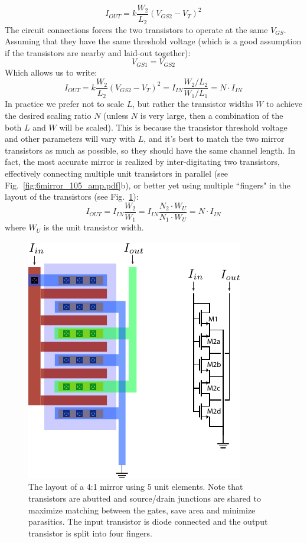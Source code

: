     \begin{equation}
        {I_{OUT}} = k\frac{{{W_2}}}{{{L_2}}}{({V_{GS2}} - {V_T})^2}
    \end{equation}
The circuit connections forces the two transistors to operate at the same $V_{GS}$.  Assuming that they have the same threshold voltage (which is a good assumption if the transistors are nearby and laid-out together):
    \begin{equation}
        {V_{GS1}} = {V_{GS2}}
    \end{equation}
Which allows us to write:
    \begin{equation}
        {I_{OUT}} = k\frac{{{W_2}}}{{{L_2}}}{({V_{GS2}} - {V_T})^2} = {I_{IN}}\frac{{{W_2}/{L_2}}}{{{W_1}/{L_1}}} = N \cdot {I_{IN}}
    \end{equation}
In practice we prefer not to scale $L$, but rather the transistor widths $W$ to achieve the desired scaling ratio $N$ (unless $N$ is very large, then a combination of the both $L$ and $W$ will be scaled).  This is because the transistor threshold voltage and other parameters will vary with $L$, and it's best to match the two mirror transistors as much as possible, so they should have the same channel length.  In fact, the most accurate mirror is realized by inter-digitating two transistors, effectively connecting multiple unit transistors in parallel (see Fig.~\ref{fig:6mirror_105_amp.pdf}b), or better yet using multiple ``fingers" in the layout of the transistors (see Fig.~\ref{fig:mirror_layout}):
    \begin{equation}
        {I_{OUT}} =  {I_{IN}}\frac{W_2}{W_1} = {I_{IN}}\frac{N_2\cdot W_U}{N_1\cdot W_U} = N \cdot {I_{IN}}
    \end{equation}
where $W_U$ is the unit transistor width.  
\begin{figure}[tb]
\centering
\includegraphics[width=.55\columnwidth]{mirror_layout.pdf} 
\caption{The layout of a 4:1 mirror using 5 unit elements. Note that transistors are abutted and source/drain junctions are shared to maximize matching between the gates, save area and minimize parasitics.  The input transistor is diode connected and the output transistor is split into four fingers.}
\label{fig:mirror_layout}
\end{figure}
